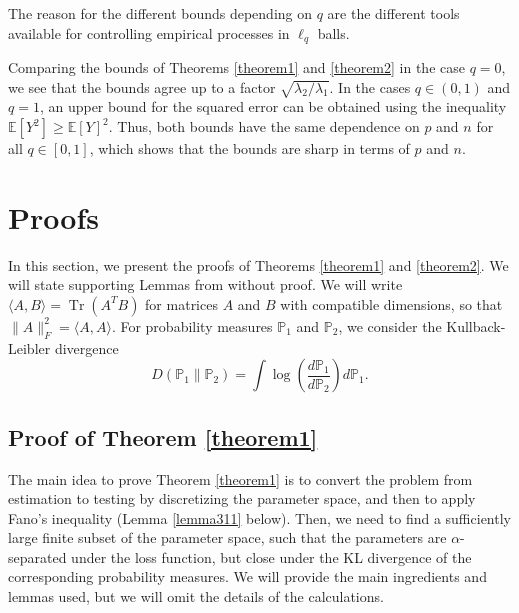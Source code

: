 \documentclass[11pt]{article}
\newcommand{\E}{\mathbb{E}}
\renewcommand{\P}{\mathbb{P}}
\begin{document}
The reason for the different bounds depending on $q$ are the different tools available for controlling empirical processes in $\ell_q$ balls.

Comparing the bounds of Theorems \ref{theorem1} and \ref{theorem2} in the case $q=0$, we see that the bounds agree up to a factor $\sqrt{\lambda_2/\lambda_1}$. In the cases $q\in (0,1)$ and $q=1$, an upper bound for the squared error can be obtained using the inequality $\E[Y^2]\ge \E[Y]^2$. Thus, both bounds have the same dependence on $p$ and $n$ for all $q\in [0,1]$, which shows that the bounds are sharp in terms of $p$ and $n$.

\section{Proofs}
\label{section:proofs}
In this section, we present the proofs of Theorems \ref{theorem1} and \ref{theorem2}. We will state supporting Lemmas from \citep{VL12} without proof. We will write $\langle A, B\rangle = \operatorname{Tr}(A^TB)$ for matrices $A$ and $B$ with compatible dimensions, so that $\|A\|_F^2 = \langle A, A\rangle$. For probability measures $\P_1$ and $\P_2$, we consider the Kullback-Leibler divergence 
\begin{equation*}
D(\P_1\|\P_2) = \int \log \left(\frac{d\P_1}{d\P_2}\right)d\P_1.
\end{equation*}

\subsection{Proof of Theorem \ref{theorem1}}
The main idea to prove Theorem \ref{theorem1} is to convert the problem from estimation to testing by discretizing the parameter space, and then to apply Fano's inequality (Lemma \ref{lemma311} below). Then, we need to find a sufficiently large finite subset of the parameter space, such that the parameters are $\alpha$-separated under the loss function, but close under the KL divergence of the corresponding probability measures. We will provide the main ingredients and lemmas used, but we will omit the details of the calculations. 
\end{document}
